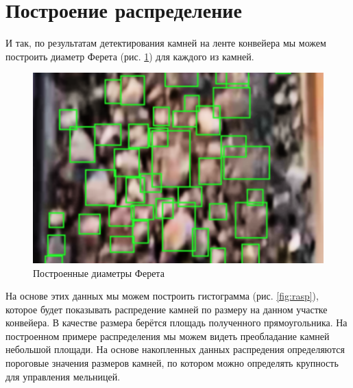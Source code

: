 \documentclass[times]{itmo-student-thesis}
\begin{document}
\section{Построение распределение}

И так, по результатам детектирования камней на ленте конвейера мы можем построить диаметр Ферета (рис. \ref{fig:feret}) для каждого из камней. 
\begin{figure}[h!]
	\centering
	\includegraphics[width=0.4\linewidth]{images/feret}
	\caption{Построенные диаметры Ферета}
	\label{fig:feret}
\end{figure}
На основе этих данных мы можем построить гистограмма (рис. \ref{fig:rasp}), которое будет показывать распредение камней по размеру на данном участке конвейера. В качестве размера берётся  площадь полученного прямоугольника.
На построенном примере распределения мы можем видеть преобладание камней небольшой площади. На основе накопленных данных распредения определяются пороговые значения размеров камней, по котором можно определять крупность для управления мельницей.
\end{document}
